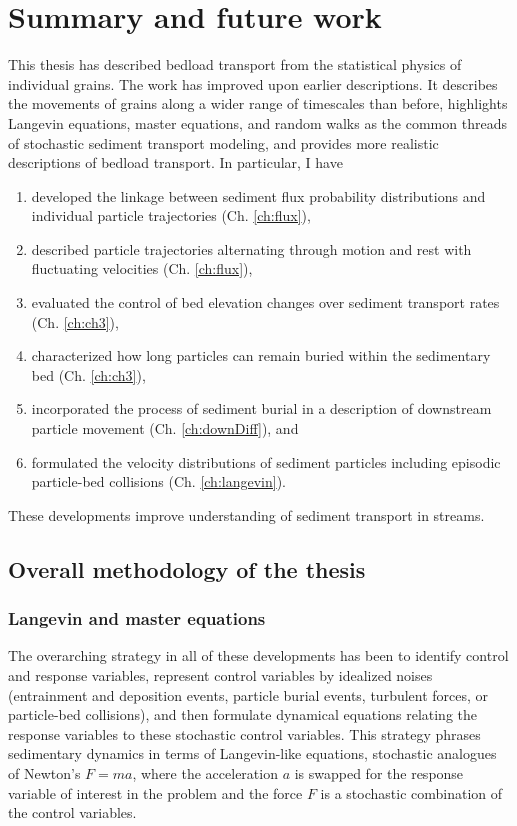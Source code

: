 
\chapter{Summary and future work}
\label{ch:conc}

This thesis has described bedload transport from the statistical physics of individual grains.
The work has improved upon earlier descriptions.
It describes the movements of grains along a wider range of timescales than before, highlights Langevin equations, master equations, and random walks as the common threads of stochastic sediment transport modeling, and provides more realistic descriptions of bedload transport. In particular, I have
\begin{enumerate}
	\item developed the linkage between sediment flux probability distributions and individual particle trajectories (Ch. \ref{ch:flux}), 
	\item described particle trajectories alternating through motion and rest with fluctuating velocities (Ch. \ref{ch:flux}),
	\item evaluated the control of bed elevation changes over sediment transport rates (Ch. \ref{ch:ch3}),
	\item characterized how long particles can remain buried within the sedimentary bed (Ch. \ref{ch:ch3}),
	\item incorporated the process of sediment burial in a description of downstream particle movement (Ch. \ref{ch:downDiff}), and
	\item formulated the velocity distributions of sediment particles including episodic particle-bed collisions (Ch. \ref{ch:langevin}).
\end{enumerate}
These developments improve understanding of sediment transport in streams.

\section{Overall methodology of the thesis}

\subsection{Langevin and master equations}

The overarching strategy in all of these developments has been to identify control and response variables, represent control variables by idealized noises (entrainment and deposition events, particle burial events, turbulent forces, or particle-bed collisions), and then formulate dynamical equations relating the response variables to these stochastic control variables.
This strategy phrases sedimentary dynamics in terms of Langevin-like equations, stochastic analogues of Newton's $F=ma$, where the acceleration $a$ is swapped for the response variable of interest in the problem and the force $F$ is a stochastic combination of the control variables. 

